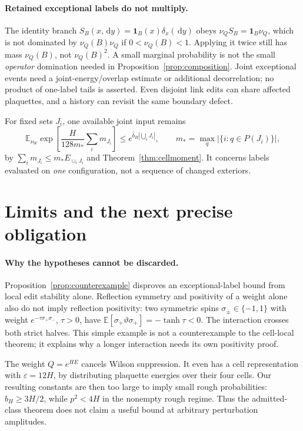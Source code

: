 \documentclass[11pt]{article}
\theoremstyle{definition}
\theoremstyle{remark}
\newcommand{\one}{\mathbf 1}
\newcommand{\E}{\mathbb E}
\newcommand{\dd}{\,\mathrm d}
\begin{document}
\paragraph{Retained exceptional labels do not multiply.}
The identity branch $S_B(x,\dd y)=\one_B(x)\delta_x(\dd y)$ obeys
$\nu_QS_B=\one_B\nu_Q$, which is not dominated by
$\nu_Q(B)\nu_Q$ if $0<\nu_Q(B)<1$. Applying it twice still has mass
$\nu_Q(B)$, not $\nu_Q(B)^2$. A small marginal probability is not the
small \emph{operator} domination needed in
Proposition~\ref{prop:composition}. Joint exceptional events need a
joint-energy/overlap estimate or additional decorrelation; no product of
one-label tails is asserted. Even disjoint link edits can share affected
plaquettes, and a history can revisit the same boundary defect.

For fixed sets $J_i$, one available joint input remains
\[
 \E_{\nu_W}\exp\left[\frac H{128m_*}\sum_i m_{J_i}\right]
 \le e^{\widehat b_H|\bigcup_iJ_i|},\qquad
 m_* =\max_q|\{i:q\in P(J_i)\}|,
\]
by $\sum_i m_{J_i}\le m_*E_{\cup_iJ_i}$ and
Theorem~\ref{thm:cellmoment}. It concerns labels evaluated on \emph{one}
configuration, not a sequence of changed exteriors.

\section{Limits and the next precise obligation}
\paragraph{Why the hypotheses cannot be discarded.}
Proposition~\ref{prop:counterexample} disproves an exceptional-label
bound from local edit stability alone. Reflection symmetry and positivity
of a weight alone also do not imply reflection positivity: two symmetric
spins $\sigma_\pm\in\{-1,1\}$ with weight
$e^{-\tau\sigma_+\sigma_-}$, $\tau>0$, have
$\E[\sigma_+\vartheta\sigma_+]=-\tanh\tau<0$. The interaction crosses
both strict halves. This simple example is not a counterexample to the
cell-local theorem; it explains why a longer interaction needs its own
positivity proof.

The weight $Q=e^{HE}$ cancels Wilson suppression. It even has a cell
representation with $\varepsilon=12H$, by distributing plaquette energies
over their four cells. Our resulting constants are then too large to
imply small rough probabilities: $\widehat b_H\ge3H/2$, while
$p^2<4H$ in the nonempty rough regime. Thus the admitted-class theorem
does not claim a useful bound at arbitrary perturbation amplitudes.
\end{document}
